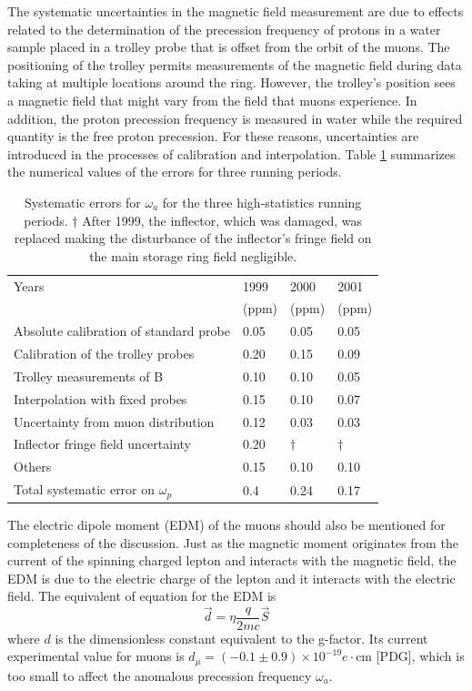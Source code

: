 \documentclass{outhesis}
\begin{document}
The systematic uncertainties in the magnetic field measurement are due to effects related to the determination of the precession frequency of protons in a water sample placed in a trolley probe that is offset from the orbit of the muons. The positioning of the trolley permits measurements of the magnetic field during data taking at multiple locations around the ring. However, the trolley's position sees a magnetic field that might vary from the field that muons experience. In addition, the proton precession frequency is measured in water while the required quantity is the free proton precession. For these reasons, uncertainties are introduced in the processes of calibration and interpolation. Table \ref{tab:wp} summarizes the numerical values of the errors for three running periods.
\begin{table}
  \caption{ Systematic errors for $\omega_a$ for the three high-statistics running periods. $\dagger$ After 1999, the inflector, which was damaged, was replaced making the disturbance of the inflector's fringe field on the main storage ring field negligible.}
  \label{tab:wp}
  \centering
  \begin{tabular}{*{4}{l}}
	\hline \hline
      Years   & 1999 & 2000  & 2001 \\ 
       & (ppm) & (ppm) & (ppm)\\
      \hline
       Absolute calibration of standard probe & 0.05 & 0.05 & 0.05  \\
       Calibration of the trolley probes & 0.20 & 0.15 & 0.09 \\
       Trolley measurements of B & 0.10 & 0.10 & 0.05  \\
       Interpolation with fixed probes & 0.15 & 0.10 &  0.07 \\
       Uncertainty from muon distribution & 0.12 & 0.03 & 0.03 \\
       Inflector fringe field uncertainty & 0.20 & $\dagger$ &  $\dagger$  \\
       Others  & 0.15 & 0.10 & 0.10     \\ \hline
       Total systematic error on $\omega_p$ & 0.4 & 0.24 & 0.17 \\ \hline  \hline
     \end{tabular}
\end{table}

The electric dipole moment (EDM) of the muons should also be mentioned for completeness of the discussion. Just as the magnetic moment originates from the current of the spinning charged lepton and interacts with the magnetic field, the EDM is due to the electric charge of the lepton and it interacts with the electric field. The equivalent of equation for the EDM is  
\begin{equation}
\overrightarrow{d} = \eta\frac{q}{2mc}\overrightarrow{S}
\label{eq:d}
\end{equation}
where $d$ is the dimensionless constant equivalent to the g-factor. Its current experimental value for muons is $d_\mu = \left(-0.1 \pm 0.9\right) \times 10^{-19} e \cdot \text{cm}$ [PDG], which is too small to affect the anomalous precession frequency $\omega_a$.
\end{document}
